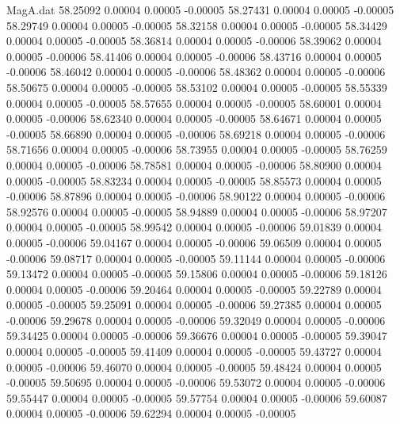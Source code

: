 \begin{filecontents}{MagA.dat}
  58.25092    0.00004    0.00005   -0.00005
  58.27431    0.00004    0.00005   -0.00005
  58.29749    0.00004    0.00005   -0.00005
  58.32158    0.00004    0.00005   -0.00005
  58.34429    0.00004    0.00005   -0.00005
  58.36814    0.00004    0.00005   -0.00006
  58.39062    0.00004    0.00005   -0.00006
  58.41406    0.00004    0.00005   -0.00006
  58.43716    0.00004    0.00005   -0.00006
  58.46042    0.00004    0.00005   -0.00006
  58.48362    0.00004    0.00005   -0.00006
  58.50675    0.00004    0.00005   -0.00005
  58.53102    0.00004    0.00005   -0.00005
  58.55339    0.00004    0.00005   -0.00005
  58.57655    0.00004    0.00005   -0.00005
  58.60001    0.00004    0.00005   -0.00006
  58.62340    0.00004    0.00005   -0.00005
  58.64671    0.00004    0.00005   -0.00005
  58.66890    0.00004    0.00005   -0.00006
  58.69218    0.00004    0.00005   -0.00006
  58.71656    0.00004    0.00005   -0.00006
  58.73955    0.00004    0.00005   -0.00005
  58.76259    0.00004    0.00005   -0.00006
  58.78581    0.00004    0.00005   -0.00006
  58.80900    0.00004    0.00005   -0.00005
  58.83234    0.00004    0.00005   -0.00005
  58.85573    0.00004    0.00005   -0.00006
  58.87896    0.00004    0.00005   -0.00006
  58.90122    0.00004    0.00005   -0.00006
  58.92576    0.00004    0.00005   -0.00005
  58.94889    0.00004    0.00005   -0.00006
  58.97207    0.00004    0.00005   -0.00005
  58.99542    0.00004    0.00005   -0.00006
  59.01839    0.00004    0.00005   -0.00006
  59.04167    0.00004    0.00005   -0.00006
  59.06509    0.00004    0.00005   -0.00006
  59.08717    0.00004    0.00005   -0.00005
  59.11144    0.00004    0.00005   -0.00006
  59.13472    0.00004    0.00005   -0.00005
  59.15806    0.00004    0.00005   -0.00006
  59.18126    0.00004    0.00005   -0.00006
  59.20464    0.00004    0.00005   -0.00005
  59.22789    0.00004    0.00005   -0.00005
  59.25091    0.00004    0.00005   -0.00006
  59.27385    0.00004    0.00005   -0.00006
  59.29678    0.00004    0.00005   -0.00006
  59.32049    0.00004    0.00005   -0.00006
  59.34425    0.00004    0.00005   -0.00006
  59.36676    0.00004    0.00005   -0.00005
  59.39047    0.00004    0.00005   -0.00005
  59.41409    0.00004    0.00005   -0.00005
  59.43727    0.00004    0.00005   -0.00006
  59.46070    0.00004    0.00005   -0.00005
  59.48424    0.00004    0.00005   -0.00005
  59.50695    0.00004    0.00005   -0.00006
  59.53072    0.00004    0.00005   -0.00006
  59.55447    0.00004    0.00005   -0.00005
  59.57754    0.00004    0.00005   -0.00006
  59.60087    0.00004    0.00005   -0.00006
  59.62294    0.00004    0.00005   -0.00005

\end{filecontents}
